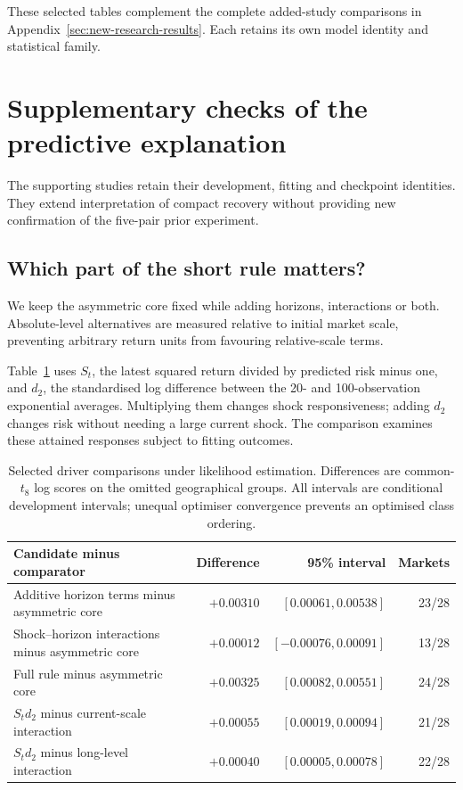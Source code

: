 These selected tables complement the complete added-study comparisons in Appendix~\ref{sec:new-research-results}. Each retains its own model identity and statistical family.




\FloatBarrier

\section{Supplementary checks of the predictive explanation}
\label{sec:supplementary-analysis}

The supporting studies retain their development, fitting and checkpoint identities. They extend interpretation of compact recovery without providing new confirmation of the five-pair prior experiment.

\subsection{Which part of the short rule matters?}

We keep the asymmetric core fixed while adding horizons, interactions or both. Absolute-level alternatives are measured relative to initial market scale, preventing arbitrary return units from favouring relative-scale terms.

Table~\ref{tab:driver-results} uses $S_t$, the latest squared return divided by predicted risk minus one, and $d_2$, the standardised log difference between the 20- and 100-observation exponential averages. Multiplying them changes shock responsiveness; adding $d_2$ changes risk without needing a large current shock. The comparison examines these attained responses subject to fitting outcomes.

\begin{table}[!htbp]
\centering
\caption[State-variable comparisons]{Selected driver comparisons under likelihood estimation. Differences are common-$t_8$ log scores on the omitted geographical groups. All intervals are conditional development intervals; unequal optimiser convergence prevents an optimised class ordering.}
\label{tab:driver-results}
\small
\begin{tabular}{p{}rrr}
\toprule
Candidate minus comparator & Difference & 95\% interval & Markets \\
\midrule
Additive horizon terms minus asymmetric core & $+0.00310$ & $[0.00061,0.00538]$ & 23/28 \\
Shock--horizon interactions minus asymmetric core & $+0.00012$ & $[-0.00076,0.00091]$ & 13/28 \\
Full rule minus asymmetric core & $+0.00325$ & $[0.00082,0.00551]$ & 24/28 \\
$S_td_2$ minus current-scale interaction & $+0.00055$ & $[0.00019,0.00094]$ & 21/28 \\
$S_td_2$ minus long-level interaction & $+0.00040$ & $[0.00005,0.00078]$ & 22/28 \\
\bottomrule
\end{tabular}
\end{table}

